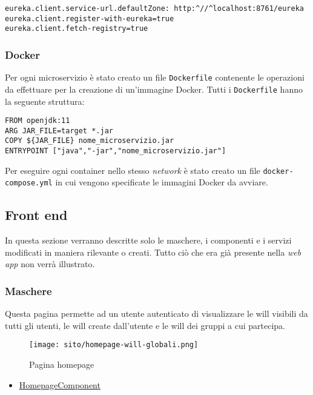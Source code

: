 \begin{lstlisting}[style=Docker, caption = {Configurazione per la registrazione di un microservizio all'\texttt{Eureka Server} nel file \texttt{application.properties}}]
eureka.client.service-url.defaultZone: http:^//^localhost:8761/eureka
eureka.client.register-with-eureka=true
eureka.client.fetch-registry=true
\end{lstlisting}

\subsubsection{Docker}
Per ogni \gls{microservizio} è stato creato un file \texttt{Dockerfile}
contenente le operazioni da effettuare per la creazione di un'immagine Docker.
Tutti i \texttt{Dockerfile} hanno la seguente struttura:

\begin{lstlisting}[style=Docker]
FROM openjdk:11
ARG JAR_FILE=target *.jar
COPY ${JAR_FILE} nome_microservizio.jar
ENTRYPOINT ["java","-jar","nome_microservizio.jar"]
\end{lstlisting}

Per eseguire ogni \gls{container} nello stesso \textit{network} è stato creato
un file \texttt{docker-compose.yml} in cui vengono specificate le immagini
Docker da avviare.
\subsection{Front end}
In questa sezione verranno descritte solo le maschere, i componenti e i servizi
modificati in maniera rilevante o creati. Tutto ciò che era già presente nella
\textit{web app} non verrà illustrato.
\subsubsection{Maschere}
Questa pagina permette ad un utente autenticato di visualizzare le \gls{will}
visibili da tutti gli utenti, le \gls{will} create dall'utente e le \gls{will}
dei gruppi a cui partecipa.
\begin{figure}[H]
    \centering
    \texttt{[image: sito/homepage-will-globali.png]}
    \caption{Pagina homepage}
\end{figure}
\begin{itemize}
    \item \hyperref[par:HomepageComponent]{HomepageComponent}
\end{itemize}

